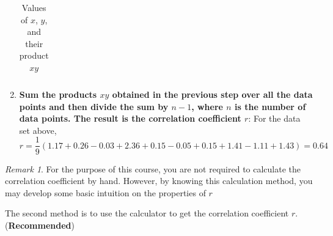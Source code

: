 \documentclass[math,code]{amznotes}
\theoremstyle{remark}
\newtheorem*{remark}{Remark}
\begin{document}
\begin{enumerate}
\begin{table}[h]
\begin{tabular}{|c|c|c|c|c|c|c|c|c|c|c|}
        \hline
        \end{tabular}
        \caption{Values of $x$, $y$, and their product $xy$}
        \label{tab:chapter3-xy_values}
    \end{table}
    \item \textbf{Sum the products $xy$ obtained in the previous step over all the data points and then divide the sum by $n-1$, where $n$ is the number of data points. The result is the correlation coefficient $r$}: For the data set above,
    \begin{equation*}
        r=\frac{1}{9}(1.17+0.26-0.03+2.36+0.15-0.05+0.15+1.41-1.11+1.43)=0.64
    \end{equation*}
\end{enumerate}
\begin{notebox}
    \begin{remark}
        For the purpose of this course, you are not required to calculate the correlation coefficient by hand. However, by knowing this calculation method, you may develop some basic intuition on the properties of $r$
    \end{remark}
\end{notebox}
The second method is to use the calculator to get the correlation coefficient $r$. \\
(\textbf{Recommended})
\end{document}
